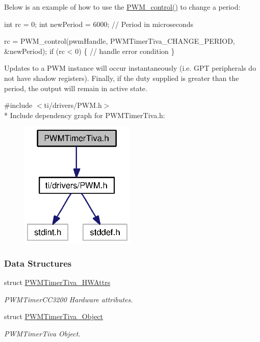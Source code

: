 Below is an example of how to use the \hyperlink{_p_w_m_8h_ade999f5b12997479efa1ac85aaf46ef5}{P\+W\+M\+\_\+control()} to change a period\+:


\begin{DoxyCode}
\textcolor{keywordtype}{int} rc = 0;
\textcolor{keywordtype}{int} newPeriod = 6000;   \textcolor{comment}{// Period in microseconds}

rc = PWM_control(pwmHandle, PWMTimerTiva_CHANGE_PERIOD, &newPeriod);
\textcolor{keywordflow}{if} (rc < 0) \{
  \textcolor{comment}{// handle error condition}
\}
\end{DoxyCode}


Updates to a P\+W\+M instance will occur instantaneously (i.\+e. G\+P\+T peripherals do not have shadow registers). Finally, if the duty supplied is greater than the period, the output will remain in active state. 

{\ttfamily \#include $<$ti/drivers/\+P\+W\+M.\+h$>$}\\*
Include dependency graph for P\+W\+M\+Timer\+Tiva.\+h\+:
\nopagebreak
\begin{figure}[H]
\begin{center}
\leavevmode
\includegraphics[width=155pt]{_p_w_m_timer_tiva_8h__incl}
\end{center}
\end{figure}
\subsubsection*{Data Structures}
\begin{DoxyCompactItemize}
\item 
struct \hyperlink{struct_p_w_m_timer_tiva___h_w_attrs}{P\+W\+M\+Timer\+Tiva\+\_\+\+H\+W\+Attrs}
\begin{DoxyCompactList}\small\item\em P\+W\+M\+Timer\+C\+C3200 Hardware attributes. \end{DoxyCompactList}\item 
struct \hyperlink{struct_p_w_m_timer_tiva___object}{P\+W\+M\+Timer\+Tiva\+\_\+\+Object}
\begin{DoxyCompactList}\small\item\em P\+W\+M\+Timer\+Tiva Object. \end{DoxyCompactList}\end{DoxyCompactItemize}
